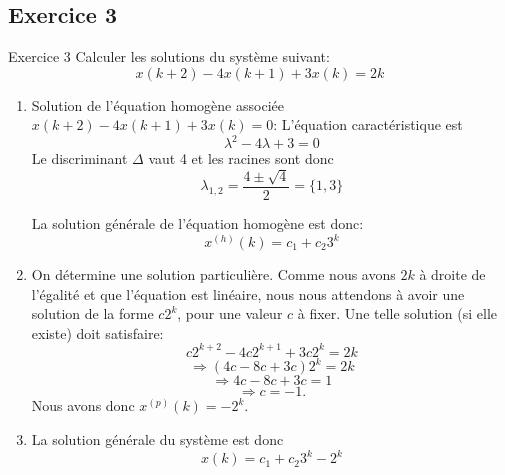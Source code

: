          \subsection{Exercice 3}
            \begin{exercise}{Exercice 3}
                Calculer les solutions du système suivant: 
                \begin{equation}
                    x(k+2)-4x(k+1)+3x(k) = 2k
                \end{equation}
            \end{exercise}
            \begin{enumerate}
                \item Solution de l’équation homogène associée $x(k+2)-4x(k+1)+3x(k) = 0$:
                L’équation caractéristique est
                \begin{equation}
                    \lambda^2-4\lambda+3 = 0
                \end{equation}
                Le discriminant $\Delta$ vaut 4 et les racines sont donc
                \begin{equation}
                    \lambda_{1,2} = \frac{4 \pm \sqrt{4}}{2} = \{1,3\}
                \end{equation}


                La solution générale de l’équation homogène est donc:
                \begin{equation}
                    x^{(h)}(k) = c_1+c_2 3^k
                \end{equation}
                \item On détermine une solution particulière. Comme nous avons $2k$ à droite de l’égalité et que l’équation est linéaire, nous nous attendons à avoir une solution de la forme $c 2^k$, pour une valeur $c$ à fixer. Une telle solution (si elle existe) doit satisfaire:
                \begin{equation}
                    c 2^{k+2}-4c 2^{k+1}+3c 2^k = 2k
                \end{equation}
                \begin{equation}
                    \Rightarrow (4c-8c+3c)2^k = 2k
                \end{equation}
                \begin{equation}
                    \Rightarrow 4c-8c+3c = 1
                \end{equation}
                \begin{equation}
                    \Rightarrow c = -1.
                \end{equation}
                Nous avons donc $x^{(p)}(k) = -2^k$.
                \item La solution générale du système est donc
                \begin{equation}
                    x(k) = c_1+c_2 3^k-2^k
                \end{equation}
            \end{enumerate}
    
